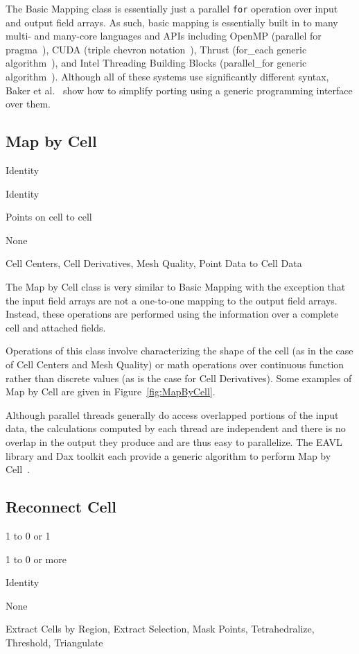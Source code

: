 \documentclass{sig-alternate}
\newcommand*{\lcite}[1]{~\cite{#1}}
\newcommand*{\scite}[1]{~\cite{#1}}
\newcommand{\etal}{et al.}
\newcommand{\algclass}[1]{\textsf{#1}}
\newcommand{\alg}[1]{#1}
\newcommand{\algorithmclasssection}[1]{\subsection*{#1}}
\newcommand{\algorithmclass}[6]{
  \algorithmclasssection{#1} %
  \begin{description}[leftmargin=9em,style=nextline,noitemsep]
    \raggedright
  \item[Point Mapping] #2
  \item[Cell Mapping] #3
  \item[Field Mapping] #4
  \item[Collective Work] #5
  \item[Algorithms] #6
  \end{description}
}
\begin{document}
The \algclass{Basic Mapping} class is essentially just a parallel
\texttt{for} operation over input and output field arrays. As such, basic
mapping is essentially built in to many multi- and many-core languages and
APIs including OpenMP (parallel for pragma\lcite{Quinn2004}), CUDA (triple
chevron notation\lcite{Sanders2011}), Thrust (for\_each generic
algorithm\lcite{Thrust}), and Intel Threading Building Blocks
(parallel\_for generic algorithm\lcite{TBB}). Although all of these systems
use significantly different syntax, Baker \etal\scite{Baker2010} show how
to simplify porting using a generic programming interface over them.


\algorithmclass{Map by Cell}
               {Identity} %
               {Identity} %
               {Points on cell to cell} %
               {None} %
               {
                 Cell Centers,
                 Cell Derivatives,
                 Mesh Quality,
                 Point Data to Cell Data
               }

\noindent
The \algclass{Map by Cell} class is very similar to \algclass{Basic
  Mapping} with the exception that the input field arrays are not a
one-to-one mapping to the output field arrays. Instead, these operations
are performed using the information over a complete cell and attached
fields.

Operations of this class involve characterizing the shape of the cell (as
in the case of \alg{Cell Centers} and \alg{Mesh Quality}) or math
operations over continuous function rather than discrete values (as is the
case for \alg{Cell Derivatives}). Some examples of \algclass{Map by Cell}
are given in Figure~\ref{fig:MapByCell}.

Although parallel threads generally do access overlapped portions of the
input data, the calculations computed by each thread are independent and
there is no overlap in the output they produce and are thus easy to
parallelize. The EAVL library and Dax toolkit each provide a generic
algorithm to perform \algclass{Map by Cell}\lcite{EAVL,Moreland2011:LDAV}.


\algorithmclass{Reconnect Cell}
               {1 to 0 or 1} %
               {1 to 0 or more} %
               {Identity} %
               {None} %
               {
                 Extract Cells by Region,
                 Extract Selection,
                 Mask Points,
                 Tetrahedralize,
                 Threshold,
                 Triangulate
               }
\end{document}
